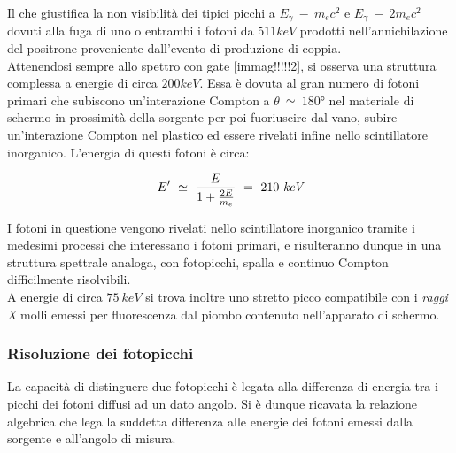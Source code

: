 \documentclass[8pt]{extarticle}
\begin{document}
Il che giustifica la non visibilità dei tipici picchi a $E_\gamma \ - \ m_e c^2$ e $E_\gamma \ - \ 2m_e c^2$ dovuti alla fuga di uno o entrambi i fotoni da $511 keV$ prodotti nell'annichilazione del positrone proveniente dall'evento di produzione di coppia.\\
Attenendosi sempre allo spettro con gate [immag!!!!!2], si osserva una struttura complessa a energie di circa $200 keV$. Essa è dovuta al gran numero di fotoni primari che subiscono un'interazione Compton a $\theta \ \simeq \ 180°$ nel materiale di schermo in prossimità della sorgente per poi fuoriuscire dal vano, subire un'interazione Compton nel plastico ed essere rivelati infine nello scintillatore inorganico. L'energia di questi fotoni è circa:

\begin{equation}
E'\ \simeq \ \frac{E}{1+\frac{2E}{m_e}} \ = \ 210\ \emph{keV}
\end{equation}

I fotoni in questione vengono rivelati nello scintillatore inorganico tramite i medesimi processi che interessano i fotoni primari, e risulteranno dunque in una struttura spettrale analoga, con fotopicchi, spalla e continuo Compton difficilmente risolvibili. \\

A energie di circa $75 \ keV$ si trova inoltre uno stretto picco compatibile con i \textit{raggi X} molli emessi per fluorescenza dal piombo contenuto nell'apparato di schermo. \cite{X_Ray}

\subsubsection{Risoluzione dei fotopicchi}
La capacità di distinguere due fotopicchi è legata alla differenza di energia tra i picchi dei fotoni diffusi ad un dato angolo. Si è dunque ricavata la relazione algebrica che lega la suddetta differenza alle energie dei fotoni emessi dalla sorgente e all'angolo di misura. 
\end{document}
